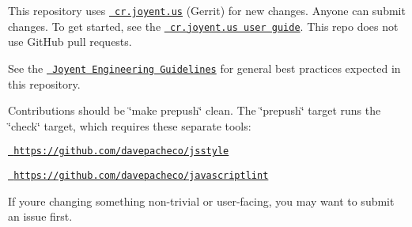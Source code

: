 This repository uses \href{https://cr.joyent.us}{\texttt{ cr.\+joyent.\+us}} (Gerrit) for new changes. Anyone can submit changes. To get started, see the \href{https://github.com/joyent/joyent-gerrit/blob/master/docs/user/README.md}{\texttt{ cr.\+joyent.\+us user guide}}. This repo does not use Git\+Hub pull requests.

See the \href{https://github.com/joyent/eng/blob/master/docs/index.md}{\texttt{ Joyent Engineering Guidelines}} for general best practices expected in this repository.

Contributions should be \char`\"{}make prepush\char`\"{} clean. The \char`\"{}prepush\char`\"{} target runs the \char`\"{}check\char`\"{} target, which requires these separate tools\+:


\begin{DoxyItemize}
\item \href{https://github.com/davepacheco/jsstyle}{\texttt{ https\+://github.\+com/davepacheco/jsstyle}}
\item \href{https://github.com/davepacheco/javascriptlint}{\texttt{ https\+://github.\+com/davepacheco/javascriptlint}}
\end{DoxyItemize}

If you\textquotesingle{}re changing something non-\/trivial or user-\/facing, you may want to submit an issue first. 